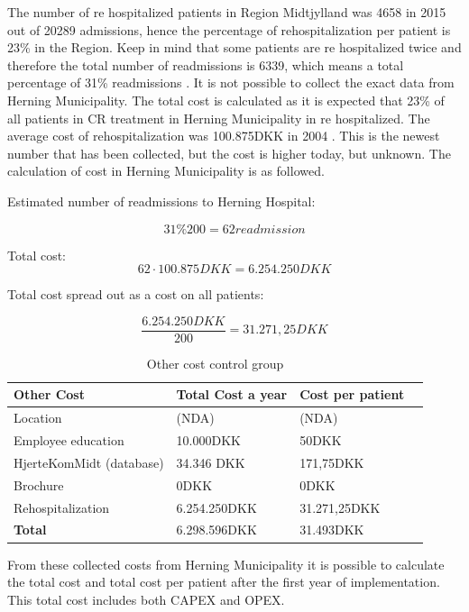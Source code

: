 The number of re hospitalized patients in Region Midtjylland was 4658 in 2015 out of 20289 admissions, hence the percentage of rehospitalization per patient is 23\% in the Region. Keep in mind that some patients are re hospitalized twice and therefore the total number of readmissions is 6339, which means a total percentage of 31\% readmissions \cite{hjertetal}. It is not possible to collect the exact data from Herning Municipality. The total cost is calculated as it is expected that 23\% of all patients in CR treatment in Herning Municipality in re hospitalized. The average cost of rehospitalization was 100.875DKK in 2004 \cite{rasmussen2011hjerterehabilitering}. This is the newest number that has been collected, but the cost is higher today, but unknown. The calculation of cost in Herning Municipality is as followed.

Estimated number of readmissions to Herning Hospital:


$$31\%200= 62 readmission$$

Total cost:
$$62\cdot100.875DKK=6.254.250DKK$$

Total cost spread out as a cost on all patients:

$$\frac{6.254.250DKK}{200}=31.271,25DKK$$



\begin{table}[H]
\begin{longtabu} to 
    \textbf{Other Cost} &\textbf{Total Cost a year} & \textbf{Cost per patient} \\[-1ex]
    \midrule
    Location   &  (NDA) & (NDA) \\ \hline
    Employee education   & 10.000DKK & 50DKK  \\ \hline
    HjerteKomMidt (database)  & 34.346 DKK &   171,75DKK \\ \hline
    Brochure & 0DKK & 0DKK \\ \hline
    Rehospitalization & 6.254.250DKK & 31.271,25DKK \\
    \hline \hline \hline
    \textbf{Total} & 6.298.596DKK  & 31.493DKK
    \newline
    \newline
   \end{longtabu}
\caption{Other cost control group}
\label{tab: OC}
\end{table}


From these collected costs from Herning Municipality it is possible to calculate the total cost and total cost per patient after the first year of implementation. This total cost includes both CAPEX and OPEX.

